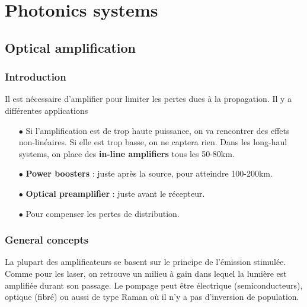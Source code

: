\chapter{Photonics systems}
\section{Optical amplification}
\subsection{Introduction}
Il est nécessaire d'amplifier pour limiter les pertes dues à la propagation. Il y a différentes
applications 
\begin{itemize}
\item[$\bullet$] Si l'amplification est de trop haute puissance, on va rencontrer des effets 
non-linéaires. Si elle est trop basse, on ne captera rien. Dans les long-haul systems, on place
des \textbf{in-line amplifiers} tous les 50-80km.
\item[$\bullet$] \textbf{Power boosters} : juste après la source, pour atteindre 100-200km.
\item[$\bullet$] \textbf{Optical preamplifier} : juste avant le récepteur.
\item[$\bullet$] Pour compenser les pertes de distribution.
\end{itemize}

\subsection{General concepts}
La plupart des amplificateurs se basent sur le principe de l'émission stimulée. Comme pour les laser, 
on retrouve un milieu à gain dans lequel la lumière est amplifiée durant son passage. Le pompage peut
être électrique (semiconducteurs), optique (fibré) ou aussi de type Raman où il n'y a pas d'inversion de
population.

